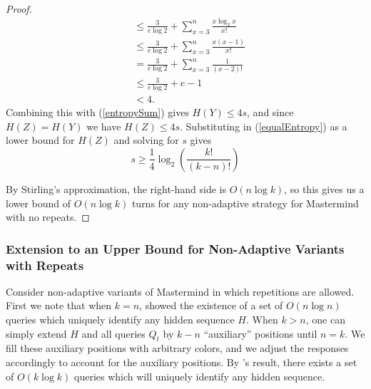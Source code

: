 \documentclass[12pt, a4paper]{article}
\begin{document}
\begin{proof}
\begin{align*}
		&\leq \frac{3}{e\log 2}+\sum_{x=3}^n \frac{x \log_2 x}{x!}\\
		&\leq \frac{3}{e\log 2}+\sum_{x=3}^n \frac{x (x-1)}{x!}\\
		&= \frac{3}{e\log 2}+\sum_{x=3}^n \frac{1}{(x-2)!}\\
		&\leq \frac{3}{e\log 2}+e-1\\
		& < 4.
	\end{align*}
	Combining this with (\ref{entropySum}) gives $H(Y) \leq 4s$, and since $H(Z) = H(Y)$ we have $H(Z) \leq 4s$. Substituting in (\ref{equalEntropy}) as a lower bound for $H(Z)$ and solving for $s$ gives
	\begin{equation*}
	s \geq \frac{1}{4}\log_2\left(\frac{k!}{(k-n)!}\right)
	\end{equation*}
	
	By Stirling's approximation, the right-hand side is $O(n\log k)$, so this gives us a lower bound of $O(n \log k)$ turns for any non-adaptive strategy for Mastermind with no repeats.
\end{proof}
\subsubsection{Extension to an Upper Bound for Non-Adaptive Variants with Repeats}
Consider non-adaptive variants of Mastermind in which repetitions are allowed. First we note that when $k=n$, \cite{DS13} showed the existence of a set of $O(n \log n)$ queries which uniquely identify any hidden sequence $H$. When $k > n$, one can simply extend $H$ and all queries $Q_t$ by $k - n$ ``auxiliary'' positions until $n = k$. We fill these auxiliary positions with arbitrary colors, and we adjust the responses accordingly to account for the auxiliary positions. By \cite{DS13}'s result, there exists a set of $O(k \log k)$ queries which will uniquely identify any hidden sequence.


\medskip


\end{document}

